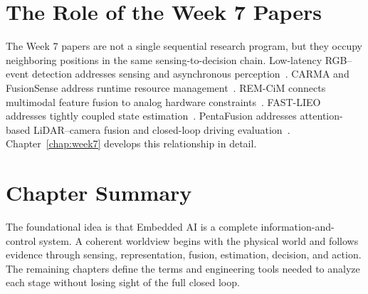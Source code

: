 \section{The Role of the Week 7 Papers}

The Week 7 papers are not a single sequential research program, but they occupy neighboring positions in the same sensing-to-decision chain. Low-latency RGB--event detection addresses sensing and asynchronous perception~\cite{gehrig2024lowlatency}. CARMA and FusionSense address runtime resource management~\cite{zhang2023carma,yun2026fusionsense}. REM-CiM connects multimodal feature fusion to analog hardware constraints~\cite{ichikawa2024remcim}. FAST-LIEO addresses tightly coupled state estimation~\cite{wang2025fastlieo}. PentaFusion addresses attention-based LiDAR--camera fusion and closed-loop driving evaluation~\cite{zhang2026pentafusion}. Chapter~\ref{chap:week7} develops this relationship in detail.

\section{Chapter Summary}

The foundational idea is that Embedded AI is a complete information-and-control system. A coherent worldview begins with the physical world and follows evidence through sensing, representation, fusion, estimation, decision, and action. The remaining chapters define the terms and engineering tools needed to analyze each stage without losing sight of the full closed loop.
